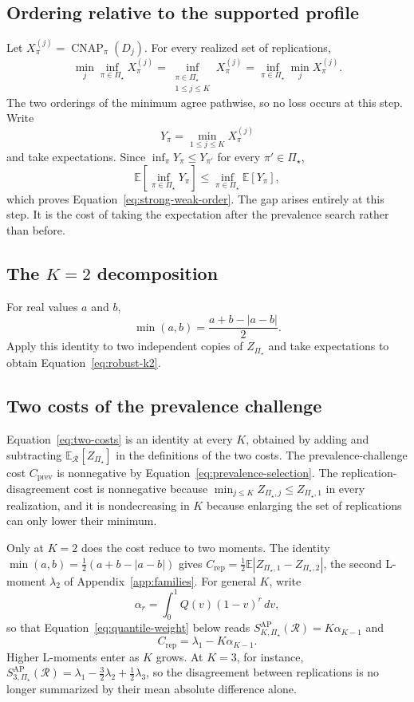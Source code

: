 \documentclass[11pt]{article}
\newcommand{\CNAP}{\operatorname{CNAP}}
\newcommand{\Regime}{\mathcal{R}}
\newcommand{\PSet}{\Pi_\star}
\newcommand{\E}{\mathbb{E}}
\newcommand{\SRob}{S_{K,\PSet}^{\mathrm{AP}}(\Regime)}
\theoremstyle{remark}
\begin{document}
\subsection{Ordering relative to the supported profile}

Let $X_\pi^{(j)}=\CNAP_\pi(D_j)$. For every realized set of replications,
\[
\min_j\inf_{\pi\in\PSet}X_\pi^{(j)}
=
\inf_{\substack{\pi\in\PSet\\1\leq j\leq K}}
X_\pi^{(j)}
=
\inf_{\pi\in\PSet}\min_jX_\pi^{(j)}.
\]
The two orderings of the minimum agree pathwise, so no loss occurs at this step. Write
\[
Y_\pi=\min_{1\leq j\leq K}X_\pi^{(j)}
\]
and take expectations. Since $\inf_\pi Y_\pi\leq Y_{\pi'}$ for every $\pi'\in\PSet$,
\[
\E\left[\inf_{\pi\in\PSet}Y_\pi\right]
\leq
\inf_{\pi\in\PSet}\E[Y_\pi],
\]
which proves Equation~\eqref{eq:strong-weak-order}. The gap arises entirely at this step. It is the cost of taking the expectation after the prevalence search rather than before.

\subsection{The $K=2$ decomposition}

For real values $a$ and $b$,
\[
\min(a,b)
=
\frac{a+b-|a-b|}{2}.
\]
Apply this identity to two independent copies of $Z_{\PSet}$ and take expectations to obtain Equation~\eqref{eq:robust-k2}.

\subsection{Two costs of the prevalence challenge}
\label{app:penalty}

Equation~\eqref{eq:two-costs} is an identity at every $K$, obtained by adding and subtracting $\E_{\Regime}[Z_{\PSet}]$ in the definitions of the two costs. The prevalence-challenge cost $C_{\mathrm{prev}}$ is nonnegative by Equation~\eqref{eq:prevalence-selection}. The replication-disagreement cost is nonnegative because $\min_{j\leq K}Z_{\PSet,j}\leq Z_{\PSet,1}$ in every realization, and it is nondecreasing in $K$ because enlarging the set of replications can only lower their minimum.

Only at $K=2$ does the cost reduce to two moments. The identity $\min(a,b)=\tfrac12(a+b-|a-b|)$ gives $C_{\mathrm{rep}}=\tfrac12\E|Z_{\PSet,1}-Z_{\PSet,2}|$, the second L-moment $\lambda_2$ of Appendix~\ref{app:families}. For general $K$, write
\[
\alpha_r=\int_0^1Q(v)(1-v)^r\,dv,
\]
so that Equation~\eqref{eq:quantile-weight} below reads $\SRob=K\alpha_{K-1}$ and
\[
C_{\mathrm{rep}}=\lambda_1-K\alpha_{K-1}.
\]
Higher L-moments enter as $K$ grows. At $K=3$, for instance, $S_{3,\PSet}^{\mathrm{AP}}(\Regime)=\lambda_1-\tfrac32\lambda_2+\tfrac12\lambda_3$, so the disagreement between replications is no longer summarized by their mean absolute difference alone.
\end{document}
